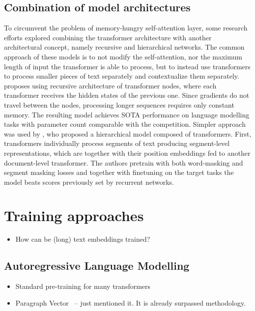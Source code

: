 \subsection{Combination of model architectures}

To circumvent the problem of memory-hungry self-attention layer, some research
efforts explored combining the transformer architecture with another
architectural concept, namely recursive and hierarchical networks. The common
approach of these models is to not modify the self-attention, nor the maximum
length of input the transformer is able to process, but to instead use
transformers to process smaller pieces of text separately and contextualize
them separately. \cite{dai2019transformer} proposes using recursive
architecture of transformer nodes, where each transformer receives the hidden
states of the previous one. Since gradients do not travel between the nodes,
processing longer sequences requires only constant memory. The resulting model
achieves SOTA performance on language modelling tasks with parameter count
comparable with the competition. Simpler approach was used by
\cite{yang2020beyond}, who proposed a hierarchical model composed of
transformers. First, transformers individually process segments of text
producing segment-level representations, which are together with their position
embeddings fed to another document-level transformer. The authors pretrain with
both word-masking and segment masking losses and together with finetuning on
the target tasks the model beats scores previously set by recurrent networks.


\section{Training approaches}

\begin{itemize}

    \item How can be (long) text embeddings trained?

\end{itemize}

\subsection{Autoregressive Language Modelling}

\begin{itemize}

    \item Standard pre-training for many transformers

    \item Paragraph Vector~\cite{le2014distributed} -- just mentioned it. It is
    already surpassed methodology.


\end{itemize}

